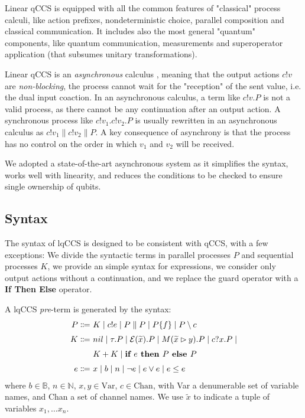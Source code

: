 Linear qCCS is equipped with all the common features of "classical" process calculi, like action prefixes, nondeterministic choice, parallel composition and classical communication. It includes also the most general "quantum" components, like quantum communication, measurements and superoperator application (that subsumes unitary transformations). 


Linear qCCS is an \textit{asynchronous} calculus  \cite{boudolAsynchronyPicalculus1992}, meaning that the output actions $c!v$ are \textit{non-blocking}, the process cannot wait for the "reception" of the sent value, i.e. the dual input coaction. In an asynchronous calculus, a term like $c!v.P$ is not a valid process, as there cannot be any continuation after an output action. A synchronous process like $c!v_1.c!v_2.P$ is usually rewritten in an asynchronous calculus as $c!v_1 \parallel c!v_2 \parallel P$. A key consequence of asynchrony is that the process has no control on the order in which $v_1$ and $v_2$ will be received.

We adopted a state-of-the-art asynchronous system as it simplifies the syntax, works well with linearity, and reduces the conditions to be checked to ensure single ownership of qubits.

\subsection{Syntax}

The syntax of lqCCS is designed to be consistent with qCCS, with a few exceptions: We divide the syntactic terms in parallel processes $P$ and sequential processes $K$, we provide an simple syntax for expressions, we consider only output actions without a continuation, and we replace the guard operator with a \textbf{If Then Else} operator.

A lqCCS \textit{pre}-term is generated by the syntax:
\begin{align*}
  P \Coloneqq &\ K \mid c!e \mid P \parallel P  \mid  P \{f\} \mid P \setminus c\\[0.1cm]
  K \Coloneqq &\ nil \mid \tau . P \mid \mathcal{E}(\widetilde{x}) . P \mid M(\widetilde{x} \rhd y) . P \mid c?x . P \mid \\[0.1cm]
  &\ K + K \mid \textbf{if } e \textbf{ then } P \textbf{ else } P \\[0.1cm]
  e \Coloneqq &\ x \mid b \mid n \mid \neg e \mid e \lor e \mid e \leq e
\end{align*}	
where $b \in \mathbb{B}$, $n \in \mathbb{N}$, $x, y \in \text{Var}$, $c \in \text{Chan}$, with Var a denumerable set of variable names, and Chan a set of channel names. We use $\widetilde{x}$ to indicate a tuple of variables $x_1, \ldots x_n$.

